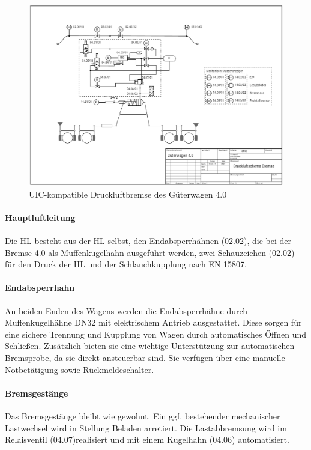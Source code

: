 \begin{figure}
    \centering%
    \includegraphics[width=12cm]{Bilder/PneumaticScheme}
    \caption{UIC-kompatible Druckluftbremse des Güterwagen 4.0}%
    \label{fig:UIC-Bremse}
\end{figure}
\paragraph{Hauptluftleitung} Die \gls{HL} besteht aus der \gls{HL} selbst, den Endabsperrhähnen (02.02), die bei der \gls{Bremse 4.0} als Muffenkugelhahn ausgeführt werden, zwei Schauzeichen (02.02) für den Druck der \gls{HL} und der Schlauchkupplung nach EN 15807.

\paragraph{Endabsperrhahn} \label{sec:Endabsperrhahn}
An beiden Enden des Wagens werden die Endabsperrhähne durch Muffenkugelhähne DN32 mit elektrischem Antrieb ausgestattet. Diese sorgen für eine sichere Trennung und Kupplung von Wagen durch automatisches Öffnen und Schließen. Zusätzlich bieten sie eine wichtige Unterstützung zur automatischen \gls{Bremsprobe}, da sie direkt ansteuerbar sind. Sie verfügen über eine manuelle Notbetätigung sowie Rückmeldeschalter.

\paragraph{Bremsgestänge} Das Bremsgestänge bleibt wie gewohnt. Ein ggf. bestehender mechanischer Lastwechsel wird in Stellung Beladen arretiert. Die Lastabbremsung wird im Relaisventil (04.07)realisiert und mit einem Kugelhahn (04.06) automatisiert. 

